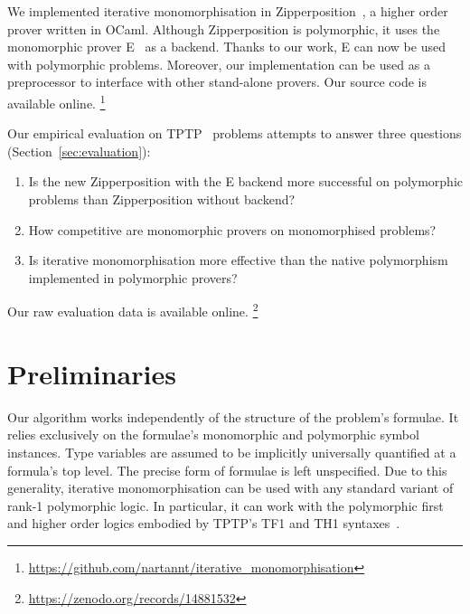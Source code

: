 \documentclass[runningheads]{llncs}
\begin{document}
We implemented iterative monomorphisation in Zipperposition~\cite{vukmirovic-et-al-2021}, a higher order prover written in OCaml. Although Zipperposition is polymorphic, it uses the monomorphic prover E~\cite{e} as a backend. Thanks to our work, E can now be used with polymorphic problems. Moreover, our implementation can be used as a preprocessor to interface with other stand-alone provers.
Our source code is available online.%
\footnote{\url{https://github.com/nartannt/iterative_monomorphisation}}

Our empirical evaluation on TPTP~\cite{tptp} problems attempts to answer three questions (Section~\ref{sec:evaluation}):
\begin{enumerate}
\item Is the new Zipperposition with the E backend more successful on polymorphic problems than Zipperposition without backend?

\item How competitive are monomorphic provers on monomorphised %
problems?

\item Is iterative monomorphisation more effective than the native polymorphism implemented in polymorphic provers?
\end{enumerate}
%
Our raw evaluation data is available online.%
\footnote{\url{https://zenodo.org/records/14881532}}

%
%

\kern-1pt %

\section{Preliminaries}
\label{sec:preliminaries}

Our algorithm works independently of the structure of the problem's formulae. It relies exclusively on the formulae's monomorphic and polymorphic symbol instances. Type variables are assumed to be implicitly universally quantified at a formula's top level. The precise form of formulae is left unspecified.
Due to this generality, iterative monomorphisation can be used with any standard variant of rank-1 polymorphic logic. In particular, it can work with the polymorphic first and higher order logics embodied by TPTP's TF1 and TH1 syntaxes~\cite{blanchette-paskevich-2013,th1}.
\end{document}

